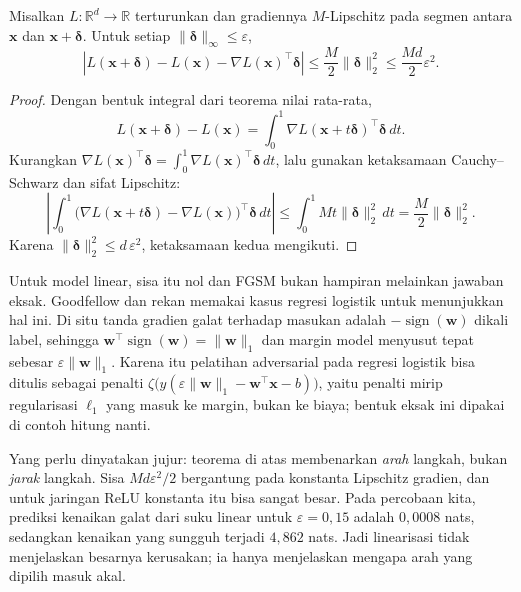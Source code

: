 \begin{teorema}
Misalkan $L:\mathbb{R}^{d}\to\mathbb{R}$ terturunkan dan gradiennya $M$-Lipschitz
pada segmen antara $\mathbf{x}$ dan $\mathbf{x}+\boldsymbol{\delta}$. Untuk setiap
$\lVert\boldsymbol{\delta}\rVert_\infty\le\varepsilon$,
\[
  \left|L(\mathbf{x}+\boldsymbol{\delta})-L(\mathbf{x})
  -\nabla L(\mathbf{x})^{\top}\boldsymbol{\delta}\right|
  \le\frac{M}{2}\lVert\boldsymbol{\delta}\rVert_2^2
  \le\frac{Md}{2}\varepsilon^2 .
\]
\end{teorema}

\begin{proof}
Dengan bentuk integral dari teorema nilai rata-rata,
\[
  L(\mathbf{x}+\boldsymbol{\delta})-L(\mathbf{x})
  =\int_0^1\nabla L(\mathbf{x}+t\boldsymbol{\delta})^{\top}\boldsymbol{\delta}\,dt .
\]
Kurangkan $\nabla L(\mathbf{x})^{\top}\boldsymbol{\delta}
=\int_0^1\nabla L(\mathbf{x})^{\top}\boldsymbol{\delta}\,dt$, lalu gunakan
ketaksamaan Cauchy--Schwarz dan sifat Lipschitz:
\[
  \left|\int_0^1\bigl(\nabla L(\mathbf{x}+t\boldsymbol{\delta})
  -\nabla L(\mathbf{x})\bigr)^{\top}\boldsymbol{\delta}\,dt\right|
  \le\int_0^1 Mt\lVert\boldsymbol{\delta}\rVert_2^2\,dt
  =\frac{M}{2}\lVert\boldsymbol{\delta}\rVert_2^2 .
\]
Karena $\lVert\boldsymbol{\delta}\rVert_2^2\le d\,\varepsilon^2$, ketaksamaan kedua
mengikuti.
\end{proof}

Untuk model linear, sisa itu nol dan FGSM bukan hampiran melainkan jawaban eksak.
Goodfellow dan rekan memakai kasus regresi logistik untuk menunjukkan hal ini. Di
situ tanda gradien galat terhadap masukan adalah $-\operatorname{sign}(\mathbf{w})$ dikali
label, sehingga
$\mathbf{w}^{\top}\operatorname{sign}(\mathbf{w})=\lVert\mathbf{w}\rVert_1$ dan margin
model menyusut tepat sebesar $\varepsilon\lVert\mathbf{w}\rVert_1$. Karena itu
pelatihan adversarial pada regresi logistik bisa ditulis sebagai penalti
$\zeta\bigl(y(\varepsilon\lVert\mathbf{w}\rVert_1-\mathbf{w}^{\top}\mathbf{x}-b)\bigr)$,
yaitu penalti mirip regularisasi $\ell_1$ yang masuk ke margin, bukan ke biaya;
bentuk eksak ini dipakai di contoh hitung nanti.

Yang perlu dinyatakan jujur: teorema di atas membenarkan \emph{arah} langkah, bukan
\emph{jarak} langkah. Sisa $Md\varepsilon^{2}/2$ bergantung pada konstanta Lipschitz
gradien, dan untuk jaringan ReLU konstanta itu bisa sangat besar. Pada percobaan kita,
prediksi kenaikan galat dari suku linear untuk $\varepsilon=0{,}15$ adalah
$0{,}0008$ nats, sedangkan kenaikan yang sungguh terjadi $4{,}862$ nats. Jadi
linearisasi tidak menjelaskan besarnya kerusakan; ia hanya menjelaskan mengapa arah
yang dipilih masuk akal.

